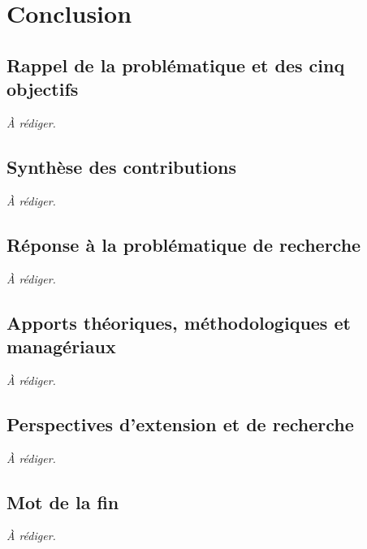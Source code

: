 \chapter{Conclusion}\label{chap:conclusion}


\section{Rappel de la probl\'ematique et des cinq objectifs}\label{sec:concl-rappel}

\textit{\`A r\'ediger.}

\section{Synth\`ese des contributions}\label{sec:concl-contributions}

\textit{\`A r\'ediger.}

\section{R\'eponse \`a la probl\'ematique de recherche}\label{sec:concl-reponse}

\textit{\`A r\'ediger.}

\section{Apports th\'eoriques, m\'ethodologiques et manag\'eriaux}\label{sec:concl-apports}

\textit{\`A r\'ediger.}

\section{Perspectives d'extension et de recherche}\label{sec:concl-perspectives}

\textit{\`A r\'ediger.}

\section{Mot de la fin}\label{sec:concl-fin}

\textit{\`A r\'ediger.}
